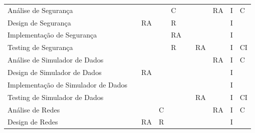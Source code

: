 \documentclass[a4paper]{report}
\begin{document}
\begin{table}[h]
\begin{adjustbox}{width=1.3\textwidth, center=\textwidth}
\begin{tabular}{l|l|l|l|l|l|l|l|l|l}
Análise de Segurança                &                           &                       &                       & C                         &                          &                         & RA       & I                 & C        \\
Design de Segurança                 &                           & RA                    &                       & R                        &                          &                         &          & I                 &         \\
Implementação de Segurança          &                           &                       &                       & RA                        &                          &                         &          & I                 &         \\
Testing de Segurança                &                           &                       &                       & R                       &                          & RA                      &          & I                 & CI       \\
Análise de Simulador de Dados       &                           &                       &                       &                           &                          &                         & RA       & I                 & C        \\
Design de Simulador de Dados        &                           & RA                    &                       &                           &                          &                         &          & I                 &         \\
Implementação de Simulador de Dados &                           &                       &                       &                           &                          &                         &          & I                 &         \\
Testing de Simulador de Dados       &                           &                       &                       &                           &                          & RA                      &          & I                 &CI       \\
Análise de Redes                    &                           &                       & C                     &                           &                          &                         & RA       & I                 &   C      \\
Design de Redes                     &                           & RA                    & R                    &                           &                          &                         &          & I                 &         \\

\end{tabular}
\end{adjustbox}
\end{table}
\end{document}
